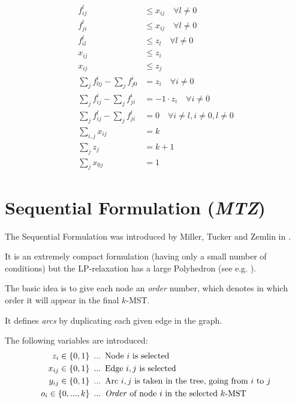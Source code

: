 \documentclass[11pt, oneside, a4paper, fleqn]{article}
\begin{document}
\begin{align}
  f^l_{ij} & \le x_{ij} \quad \forall l \ne 0 \\
  f^l_{ji} & \le x_{ij} \quad \forall l \ne 0 \\
  f^l_{il} & \le z_l \quad \forall l \ne 0 \\
  x_{ij} & \le z_i \\
  x_{ij} & \le z_j \\
  \sum_{j}f^i_{0j} - \sum_{j}f^i_{j0} & = z_i
           \quad \forall i \ne 0 \\
  \sum_{j}f^i_{ij} - \sum_{j}f^i_{ji} & = -1\cdot z_i
           \quad \forall i \ne 0 \\
  \sum_{j}f^l_{ij} - \sum_{j}f^l_{ji} & = 0
           \quad \forall i \ne l, i \ne 0, l \ne 0 \\
  \sum_{i,j}x_{ij} & = k \\
  \sum_{j} z_j & = k + 1 \\
  \sum_{j} x_{0j} & = 1
\end{align}

\section*{Sequential Formulation (\emph{MTZ})}

The Sequential Formulation was introduced by Miller, Tucker and
Zemlin in \cite{mtz1960}.

It is an extremely compact formulation (having only a small
number of conditions) but the LP-relaxation has a large Polyhedron
(see e.g. \cite{padberg1991}).

The basic idea is to give each node an \emph{order}
number, which denotes in which order it will appear in the
final $k$-MST.

It defines \emph{arcs} by duplicating each given edge in
the graph.

The following variables are introduced:
\begin{align*}
  z_i \in\{0,1\} & \enskip ... \enskip \text{Node $i$ is selected}\\
  x_{ij} \in\{0,1\} & \enskip ... \enskip\text{Edge $i,j$ is selected}\\
  y_{ij} \in\{0,1\} & \enskip ... \enskip\text{Arc $i,j$ is taken
             in the tree, going from $i$ to $j$} \\
  o_{i} \in\{0,...,k\} & \enskip ... \enskip\text{\emph{Order}
             of node $i$ in the selected $k$-MST}
\end{align*}
\end{document}
